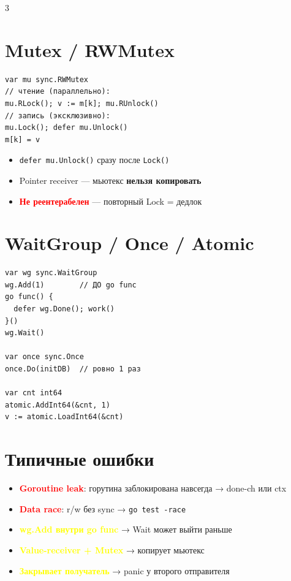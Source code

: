 \documentclass[8.5pt,a4paper]{article}
\newenvironment{clist}{%
  \begin{itemize}[leftmargin=9pt,itemsep=0pt,topsep=0.5pt,parsep=0pt,
    label=\textcolor{muted}{\fontsize{5}{5}\textbullet}]
    \setlength{\itemsep}{0pt}
}{\end{itemize}}
\newcommand{\hl}[2]{\textbf{\textcolor{#1}{#2}}}
\begin{document}
\begin{multicols}{3}
\section{Mutex / RWMutex}

\begin{lstlisting}
var mu sync.RWMutex
// чтение (параллельно):
mu.RLock(); v := m[k]; mu.RUnlock()
// запись (эксклюзивно):
mu.Lock(); defer mu.Unlock()
m[k] = v
\end{lstlisting}

\begin{clist}
  \item \texttt{defer mu.Unlock()} сразу после \texttt{Lock()}
  \item Pointer receiver — мьютекс \textbf{нельзя копировать}
  \item \hl{red}{Не реентерабелен} — повторный Lock = дедлок
\end{clist}

\section{WaitGroup / Once / Atomic}

\begin{lstlisting}
var wg sync.WaitGroup
wg.Add(1)        // ДО go func
go func() {
  defer wg.Done(); work()
}()
wg.Wait()

var once sync.Once
once.Do(initDB)  // ровно 1 раз

var cnt int64
atomic.AddInt64(&cnt, 1)
v := atomic.LoadInt64(&cnt)
\end{lstlisting}

\section{Типичные ошибки}

\begin{clist}
  \item \hl{red}{Goroutine leak}: горутина заблокирована навсегда → done-ch или ctx
  \item \hl{red}{Data race}: r/w без sync → \texttt{go test -race}
  \item \hl{yellow}{wg.Add внутри go func} → Wait может выйти раньше
  \item \hl{yellow}{Value-receiver + Mutex} → копирует мьютекс
  \item \hl{yellow}{Закрывает получатель} → panic у второго отправителя
\end{clist}


\end{multicols}
\end{document}

